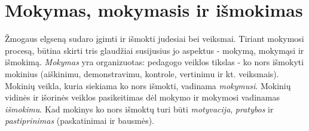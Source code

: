 \section{Mokymas, mokymasis ir išmokimas}

\label{tema:mokymas_mokymasis}

Žmogaus elgseną sudaro įgimti ir išmokti judesiai bei veiksmai. Tiriant 
mokymosi procesą, būtina skirti tris glaudžiai susijusius jo aspektus - 
mokymą, mokymąsi ir išmokimą. \emph{Mokymas} yra organizuotas: pedagogo veiklos 
tikslas - ko nors išmokyti mokinius (aiškinimu, demonstravimu, kontrole,
vertinimu ir kt. veiksmais). Mokinių veikla, kuria siekiama ko nors
išmokti, vadinama \emph{mokymusi}. Mokinių vidinės ir išorinės veiklos 
pasikeitimas dėl mokymo ir mokymosi vadinamas \emph{išmokimu}. Kad mokinys
ko nors išmoktų turi būti \emph{motyvacija}, \emph{pratybos} ir 
\emph{pastiprinimas} (paskatinimai ir bausmės).
